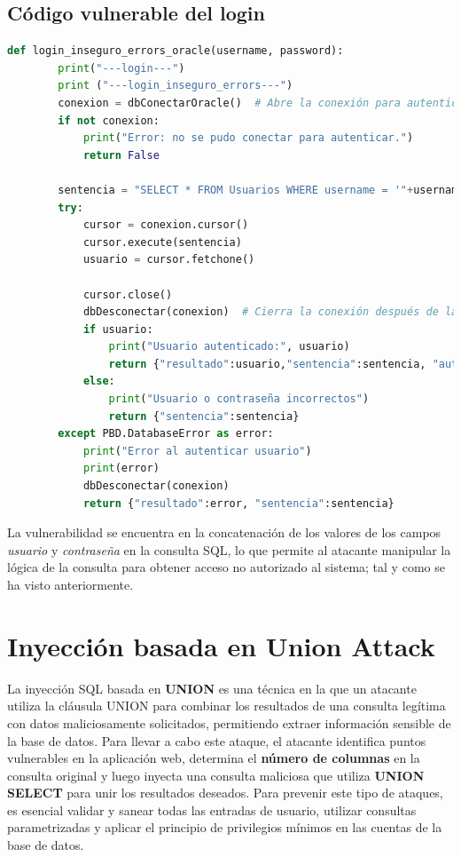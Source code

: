 \documentclass[a4paper,12pt]{article}
\begin{document}
\subsection{Código vulnerable del login}

\begin{lstlisting}[language=Python]
    def login_inseguro_errors_oracle(username, password):
        print("---login---")
        print ("---login_inseguro_errors---")
        conexion = dbConectarOracle()  # Abre la conexión para autenticación
        if not conexion:
            print("Error: no se pudo conectar para autenticar.")
            return False
    
        sentencia = "SELECT * FROM Usuarios WHERE username = '"+username+"' AND password = '"+password+"'"
        try:
            cursor = conexion.cursor()
            cursor.execute(sentencia)
            usuario = cursor.fetchone()
    
            cursor.close()
            dbDesconectar(conexion)  # Cierra la conexión después de la autenticación
            if usuario:
                print("Usuario autenticado:", usuario)
                return {"resultado":usuario,"sentencia":sentencia, "auth":"true"}
            else:
                print("Usuario o contraseña incorrectos")
                return {"sentencia":sentencia}
        except PBD.DatabaseError as error:
            print("Error al autenticar usuario")
            print(error)
            dbDesconectar(conexion)
            return {"resultado":error, "sentencia":sentencia}
    \end{lstlisting}
    
La vulnerabilidad se encuentra en la concatenación de los valores de los campos \textit{usuario} y \textit{contraseña} en la consulta SQL, 
lo que permite al atacante manipular la lógica de la consulta para obtener acceso no autorizado al sistema; tal y como se ha visto anteriormente.

\section{Inyección basada en Union Attack}
La inyección SQL basada en \textbf{UNION} es una técnica en la que un atacante utiliza la cláusula UNION para combinar los resultados de una consulta legítima con datos maliciosamente solicitados, permitiendo extraer información sensible de la base de datos. 
Para llevar a cabo este ataque, el atacante identifica puntos vulnerables en la aplicación web, determina el \textbf{número de columnas} en la consulta original y luego inyecta una consulta maliciosa que utiliza \textbf{UNION SELECT} para unir los resultados deseados. 
Para prevenir este tipo de ataques, es esencial validar y sanear todas las entradas de usuario, utilizar consultas parametrizadas y aplicar el principio de privilegios mínimos en las cuentas de la base de datos.
\end{document}

